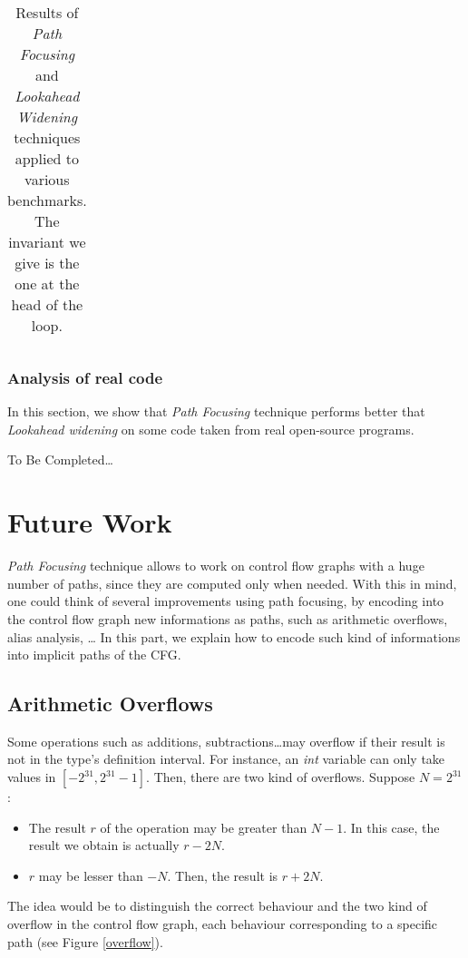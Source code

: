 \documentclass[a4paper,english,titlepage,11pt]{report}
\begin{document}
\begin{table}[!h]
\begin{tabular}{|c|c|c|l||c|l|}
\end{tabular}
\caption{Results of \emph{Path Focusing} and \emph{Lookahead Widening}
techniques applied to various benchmarks. The invariant we give is the one at
the head of the loop.}
\label{experiments}
\end{table}


	\subsection{Analysis of real code}

	In this section, we show that \emph{Path Focusing} technique performs better
	that \emph{Lookahead widening} on some code taken from real open-source
	programs.

	To Be Completed\dots

\chapter{Future Work}
\label{future}
\emph{Path Focusing} technique allows to work on control flow graphs with a huge
number of paths, since they are computed only when needed. With this in mind,
one could think of several improvements using path focusing, by encoding into
the control flow graph new informations as paths, such as arithmetic overflows,
alias analysis, \dots
In this part, we explain how to encode such kind of informations into implicit
paths of the CFG.

	\section{Arithmetic Overflows}

Some operations such as additions, subtractions\dots may overflow if their
result is not in the type's definition interval. For instance, an
\emph{int} variable can only take values in $[-2^{31}, 2^{31} -1]$. Then, there
are two kind of overflows. Suppose $N=2^{31}$:
\begin{itemize}
\item The result $r$ of the operation may be greater than $N-1$. In this case,
the result we obtain is actually $r-2N$.
\item $r$ may be lesser than $-N$. Then, the result is $r+2N$.
\end{itemize}

The idea would be to distinguish the correct behaviour and the two kind of
overflow in the control flow graph, each behaviour corresponding to a specific
path (see Figure \ref{overflow}).
\end{document}
